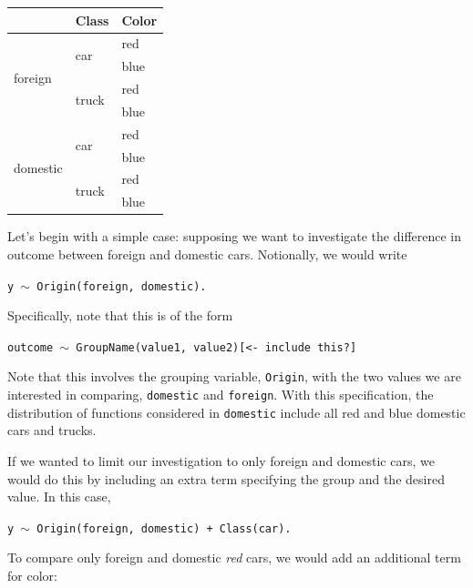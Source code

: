\documentclass{article}
\newcommand{\xt}{\texttt}%
\begin{document}
\begin{center}

\begin{tabular}{|p{0.9in}|p{0.9in}|p{0.9in}|} \hline 
\rowcolor{lightgray} \multicolumn{1}{|c|}{Origin} & \multicolumn{1}{c|}{Class} & \multicolumn{1}{c|}{Color}\\
\hline
\multirow{4}{*}{foreign} & \multirow{2}{*}{car} & red \\
\hhline{~~-}
& & blue \\
\hhline{~--}
& \multirow{2}{*}{truck} & red \\
\hhline{~~-}
& & blue \\
\hline
\multirow{4}{*}{domestic} & \multirow{2}{*}{car} & red \\
\hhline{~~-}
& & blue \\
\hhline{~--}
& \multirow{2}{*}{truck} & red \\
\hhline{~~-}
& & blue \\
\hline
\end{tabular}
\end{center}

Let's begin with a simple case: supposing we want to investigate the difference in outcome between foreign and domestic cars. Notionally, we would write

\begin{center}
\tt y $\sim$ Origin(foreign, domestic).
\end{center}

Specifically, note that this is of the form

\begin{center}  
\tt outcome $\sim$ GroupName(value1, value2)[<- include this?]
\end{center}

Note that this involves the grouping variable, \xt{Origin}, with the two values we are interested in comparing, \xt{domestic} and \xt{foreign}. With this specification, the distribution of functions considered in \xt{domestic} include all red and blue domestic cars and trucks.


If we wanted to limit our investigation to only foreign and domestic cars, we would do this by including an extra term specifying the group and the desired value. In this case, 

\begin{center}
\tt y $\sim$ Origin(foreign, domestic) + Class(car).
\end{center}
To compare only foreign and domestic \textit{red} cars, we would add an additional term for color:
\end{document}
